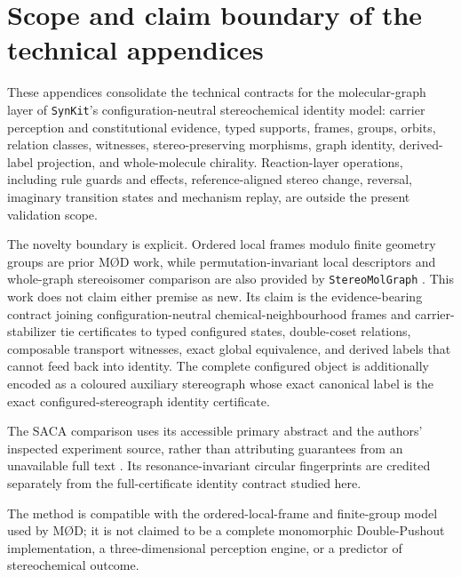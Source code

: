 \documentclass[pdflatex,sn-mathphys-num,referee,lineno]{sn-jnl}
\newcommand{\synkit}{\texttt{SynKit}\xspace}
\newcommand{\stereomolgraph}{\texttt{StereoMolGraph}\xspace}
\theoremstyle{plain}
\theoremstyle{remark}
\theoremstyle{definition}
\begin{document}
\begingroup
\let\sqF\relax
\let\tbpF\relax
\let\octF\relax
\let\bondF\relax


\section{Scope and claim boundary of the technical appendices}
\label{sec:si-scope}

These appendices consolidate the technical contracts for the
molecular-graph layer of \synkit's configuration-neutral stereochemical
identity model: carrier perception and constitutional evidence, typed supports,
frames, groups, orbits, relation classes, witnesses,
stereo-preserving morphisms, graph identity, derived-label projection, and
whole-molecule chirality. Reaction-layer operations, including rule guards and
effects, reference-aligned stereo change, reversal, imaginary transition
states and mechanism replay, are outside the present validation scope.

The novelty boundary is explicit.  Ordered local frames modulo finite geometry
groups are prior M{\O}D work, while permutation-invariant local descriptors and
whole-graph stereoisomer comparison are also provided by \stereomolgraph
\cite{andersen2017stereo,papusha2026stereomolgraph}.  This work does not claim
either premise as new.  Its claim is the evidence-bearing contract joining
configuration-neutral chemical-neighbourhood frames and carrier-stabilizer tie
certificates to typed configured states, double-coset relations, composable
transport witnesses, exact global equivalence, and derived labels that cannot
feed back into identity.  The complete configured object is additionally
encoded as a coloured auxiliary stereograph whose exact canonical label is the
exact configured-stereograph identity certificate.

The SACA comparison uses its accessible primary abstract and the authors'
inspected experiment source, rather than attributing guarantees from an
unavailable full text \cite{papusha2026saca}. Its resonance-invariant circular
fingerprints are credited separately from the full-certificate identity
contract studied here.

The method is compatible with the ordered-local-frame and finite-group
model used by M{\O}D; it is not claimed to be a complete
monomorphic Double-Pushout implementation, a three-dimensional perception
engine, or a predictor of stereochemical outcome.
\end{document}
